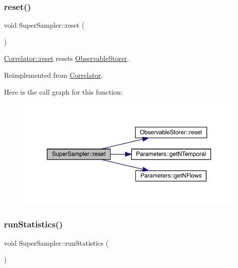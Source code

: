 \subsubsection{\texorpdfstring{reset()}{reset()}}
{\footnotesize\ttfamily void Super\+Sampler\+::reset (\begin{DoxyParamCaption}{ }\end{DoxyParamCaption})\hspace{0.3cm}{\ttfamily [virtual]}}



\mbox{\hyperlink{class_correlator_aacca40262d2cd62f0a3964e832f948c1}{Correlator\+::reset}} resets \mbox{\hyperlink{class_observable_storer}{Observable\+Storer}}. 



Reimplemented from \mbox{\hyperlink{class_correlator_aacca40262d2cd62f0a3964e832f948c1}{Correlator}}.

Here is the call graph for this function\+:\nopagebreak
\begin{figure}[H]
\begin{center}
\leavevmode
\includegraphics[width=350pt]{class_super_sampler_ab2f028561e015500fac1e3093aa4a725_cgraph}
\end{center}
\end{figure}
\mbox{\label{class_super_sampler_af96f7d461e9159adb4eef9bda9c6ecde}} 
\subsubsection{\texorpdfstring{runStatistics()}{runStatistics()}}
{\footnotesize\ttfamily void Super\+Sampler\+::run\+Statistics (\begin{DoxyParamCaption}{ }\end{DoxyParamCaption})\hspace{0.3cm}{\ttfamily [virtual]}}



